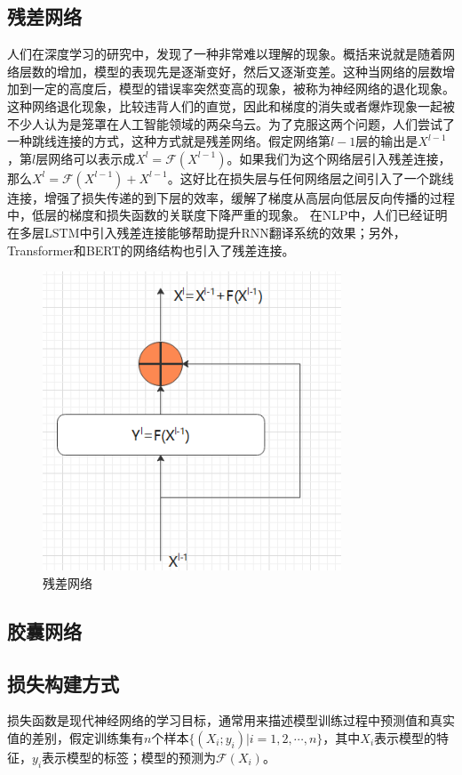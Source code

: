 \documentclass[twoside,a4paper,12pt]{book}%
\begin{document}
\subsection{残差网络}
人们在深度学习的研究中，发现了一种非常难以理解的现象。概括来说就是随着网络层数的增加，模型的表现先是逐渐变好，然后又逐渐变差。这种当网络的层数增加到一定的高度后，模型的错误率突然变高的现象，被称为神经网络的退化现象。这种网络退化现象，比较违背人们的直觉，因此和梯度的消失或者爆炸现象一起被不少人认为是笼罩在人工智能领域的两朵乌云。为了克服这两个问题，人们尝试了一种跳线连接的方式，这种方式就是残差网络。假定网络第$l-1$层的输出是$X^{l-1}$，第$l$层网络可以表示成$X^l=\mathcal{F}(X^{l-1})$。如果我们为这个网络层引入残差连接，那么$X^l=\mathcal{F}(X^{l-1})+X^{l-1}$。这好比在损失层与任何网络层之间引入了一个跳线连接，增强了损失传递的到下层的效率，缓解了梯度从高层向低层反向传播的过程中，低层的梯度和损失函数的关联度下降严重的现象。
在\gls{NLP}中，人们已经证明在多层\gls{LSTM}中引入残差连接能够帮助提升\gls{RNN}翻译系统的效果；另外，Transformer和\gls{BERT}的网络结构也引入了残差连接。
\begin{figure}[ht]
\begin{center}
\includegraphics[width=3.5in]{figures/resnet.png}
\caption{残差网络}
\label{fig:resnet}
\end{center}
\end{figure}

\subsection{胶囊网络}

\subsection{损失构建方式}
损失函数是现代神经网络的学习目标，通常用来描述模型训练过程中预测值和真实值的差别，假定训练集有$n$个样本$\{(X_i;y_i)|i=1,2,\cdots,n\}$，其中$X_i$表示模型的特征，$y_i$表示模型的标签；模型的预测为$\mathcal{F}(X_i)$。
\end{document}
